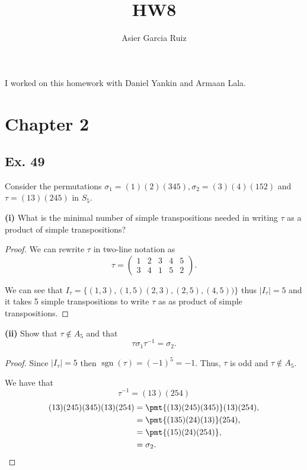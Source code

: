 \documentclass{article}
\title{HW8}
\author{Asier Garcia Ruiz}
\DeclareMathOperator*{\sgn}{sgn}
\newenvironment{hwproof}[1]
{
    #1
    \begin{proof}
}{
    \end{proof}
}
\begin{document}
\maketitle

I worked on this homework with Daniel Yankin and Armaan Lala.
\section*{Chapter 2}
\subsection*{Ex. 49}
Consider the permutations $\sigma_1 = (1)(2)(345), \sigma_2 = (3)(4)(152)$ and
$\tau = (13)(245)$ in $S_5$.

\begin{hwproof}
    {
        \textbf{(i)} What is the minimal number of simple transpositions needed in
        writing $\tau$ as a product of simple transpositions?
    }
    We can rewrite $\tau$ in two-line notation as
    \begin{equation*}
        \tau = \begin{pmatrix}
            1 & 2 & 3 & 4 & 5 \\
            3 & 4 & 1 & 5 & 2
        \end{pmatrix}.
    \end{equation*}

    We can see that $I_\tau = \{(1,3), (1,5) (2,3), (2,5), (4,5))\}$
    thus $|I_\tau | = 5$ and it takes 5 simple transpositions to write $\tau$ as
    as product of simple transpositions.
\end{hwproof}

\begin{hwproof}
    {
        \textbf{(ii)} Show that $\tau \not \in A_5$ and that
        \begin{equation*}
            \tau \sigma_1 \tau^{-1} = \sigma_2.
        \end{equation*}
    }
    Since $|I_\tau | = 5$ then $\sgn(\tau) = (-1)^5 = -1$. Thus, $\tau$
    is odd and $\tau \not \in A_5$.

    We have that
    \begin{equation*}
        \tau^{-1} = (13)(254)
    \end{equation*}
    \begin{align*}
        (13)(245)(345)(13)(254) & = \pmt{(13)(245)(345)}(13)(254), \\
                                & = \pmt{(135)(24)(13)}(254),      \\
                                & = \pmt{(15)(24)(254)},           \\
                                & = \sigma_2.
    \end{align*}
\end{hwproof}
\end{document}
